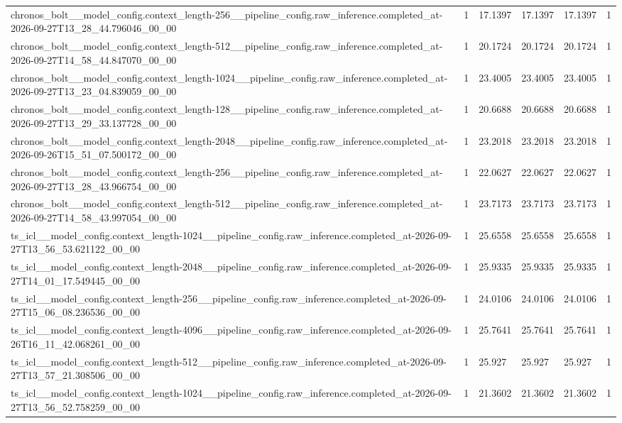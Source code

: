 \begin{tabular}{llllll}
chronos\_bolt\_\_model\_config.context\_length-256\_\_pipeline\_config.raw\_inference.completed\_at-2026-09-27T13\_28\_44.796046\_00\_00 & 1 & 17.1397 & 17.1397 & 17.1397 & 1 \\
chronos\_bolt\_\_model\_config.context\_length-512\_\_pipeline\_config.raw\_inference.completed\_at-2026-09-27T14\_58\_44.847070\_00\_00 & 1 & 20.1724 & 20.1724 & 20.1724 & 1 \\
chronos\_bolt\_\_model\_config.context\_length-1024\_\_pipeline\_config.raw\_inference.completed\_at-2026-09-27T13\_23\_04.839059\_00\_00 & 1 & 23.4005 & 23.4005 & 23.4005 & 1 \\
chronos\_bolt\_\_model\_config.context\_length-128\_\_pipeline\_config.raw\_inference.completed\_at-2026-09-27T13\_29\_33.137728\_00\_00 & 1 & 20.6688 & 20.6688 & 20.6688 & 1 \\
chronos\_bolt\_\_model\_config.context\_length-2048\_\_pipeline\_config.raw\_inference.completed\_at-2026-09-26T15\_51\_07.500172\_00\_00 & 1 & 23.2018 & 23.2018 & 23.2018 & 1 \\
chronos\_bolt\_\_model\_config.context\_length-256\_\_pipeline\_config.raw\_inference.completed\_at-2026-09-27T13\_28\_43.966754\_00\_00 & 1 & 22.0627 & 22.0627 & 22.0627 & 1 \\
chronos\_bolt\_\_model\_config.context\_length-512\_\_pipeline\_config.raw\_inference.completed\_at-2026-09-27T14\_58\_43.997054\_00\_00 & 1 & 23.7173 & 23.7173 & 23.7173 & 1 \\
ts\_icl\_\_model\_config.context\_length-1024\_\_pipeline\_config.raw\_inference.completed\_at-2026-09-27T13\_56\_53.621122\_00\_00 & 1 & 25.6558 & 25.6558 & 25.6558 & 1 \\
ts\_icl\_\_model\_config.context\_length-2048\_\_pipeline\_config.raw\_inference.completed\_at-2026-09-27T14\_01\_17.549445\_00\_00 & 1 & 25.9335 & 25.9335 & 25.9335 & 1 \\
ts\_icl\_\_model\_config.context\_length-256\_\_pipeline\_config.raw\_inference.completed\_at-2026-09-27T15\_06\_08.236536\_00\_00 & 1 & 24.0106 & 24.0106 & 24.0106 & 1 \\
ts\_icl\_\_model\_config.context\_length-4096\_\_pipeline\_config.raw\_inference.completed\_at-2026-09-26T16\_11\_42.068261\_00\_00 & 1 & 25.7641 & 25.7641 & 25.7641 & 1 \\
ts\_icl\_\_model\_config.context\_length-512\_\_pipeline\_config.raw\_inference.completed\_at-2026-09-27T13\_57\_21.308506\_00\_00 & 1 & 25.927 & 25.927 & 25.927 & 1 \\
ts\_icl\_\_model\_config.context\_length-1024\_\_pipeline\_config.raw\_inference.completed\_at-2026-09-27T13\_56\_52.758259\_00\_00 & 1 & 21.3602 & 21.3602 & 21.3602 & 1 \\

\end{tabular}
